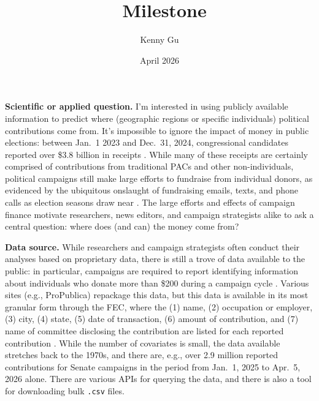 \documentclass[11pt]{article}
\title{\class\ Milestone \hwnum}
\author{Kenny Gu}
\date{April 2026}
\newcommand{\class}{Stats 305c}
\newcommand{\hwnum}{1}
\newcommand{\quarter}{Spring 2026}
\begin{document}
 


\newcommand{\KL}{\text{KL}}
\newcommand{\pse}{\tilde{E}}
\newcommand{\Et}{\tilde{E}}
\newcommand{\bm}[1]{\mathbf{#1}}
\renewcommand{\d}{\mathrm{d}}

\textbf{Scientific or applied question.} I'm interested in using publicly available information to predict where (geographic regions or specific individuals) political contributions come from. It's impossible to ignore the impact of money in public elections: between Jan.\ 1 2023 and Dec.\ 31, 2024, congressional candidates reported over \$3.8 billion in receipts \cite{fec2024}. While many of these receipts are certainly comprised of contributions from traditional PACs and other non-individuals, political campaigns still make large efforts to fundraise from individual donors, as evidenced by the ubiquitous onslaught of fundraising emails, texts, and phone calls as election seasons draw near \cite{miller2022_smallruin,wong2026_fundraisingemail}. The large efforts and effects of campaign finance motivate researchers, news editors, and campaign strategists alike to ask a central question: where does (and can) the money come from?

\textbf{Data source.} While researchers and campaign strategists often conduct their analyses based on proprietary data, there is still a trove of data available to the public: in particular, campaigns are required to report identifying information about individuals who donate more than \$200 during a campaign cycle \cite{fec2026_individualcontributionsreq}. Various sites (e.g., ProPublica) repackage this data, but this data is available in its most granular form through the FEC, where the (1) name, (2) occupation or employer, (3) city, (4) state, (5) date of transaction, (6) amount of contribution, and (7) name of committee disclosing the contribution are listed for each reported contribution \cite{fec2026_individualcontributions}. While the number of covariates is small, the data available stretches back to the 1970s, and there are, e.g., over 2.9 million reported contributions for Senate campaigns in the period from Jan.\ 1, 2025 to Apr.\ 5, 2026 alone. There are various APIs for querying the data, and there is also a tool for downloading bulk \texttt{.csv} files.
\end{document}
